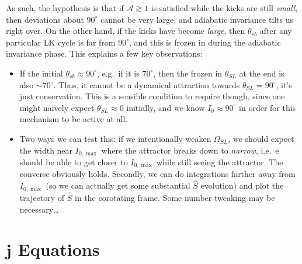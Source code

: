 \documentclass[11pt,
        usenames, %
        dvipsnames %
    ]{article}
\newcommand*{\bm}[1]{\boldsymbol{\mathbf{#1}}}
\begin{document}
As such, the hypothesis is that if $\mathcal{A} \gtrsim 1$ is satisfied while
the kicks are still \emph{small}, then deviations about $90^\circ$ cannot be
very large, and adiabatic invariance tilts us right over. On the other hand, if
the kicks have become \emph{large}, then $\theta_{sb}$ after any particular LK
cycle is far from $90^\circ$, and this is frozen in during the adiabatic
invariance phase. This explains a few key observations:
\begin{itemize}
    \item If the initial $\theta_{sb} \approx 90^\circ$, e.g.\ if it is
        $70^\circ$, then the frozen in $\theta_{SL}$ at the end is also $\sim
        70^\circ$. Thus, it cannot be a dynamical attraction towards
        $\theta_{SL} = 90^\circ$, it's just conservation. This is a sensible
        condition to require though, since one might naively expect $\theta_{SL}
        \approx 0$ initially, and we know $I_0 \approx 90^\circ$ in order for
        this mechanism to be active at all.

    \item Two ways we can test this: if we intentionally weaken $\Omega_{SL}$,
        we should expect the width near $I_{0, \max}$ where the attractor breaks
        down to \emph{narrow}, i.e.\ e should be able to get closer to $I_{0,
        \max}$ while still seeing the attractor. The converse obviously holds.
        Secondly, we can do integrations farther away from $I_{0, \max}$ (so we
        can actually get some substantial $\hat{S}$ evolution) and plot the
        trajectory of $\hat{S}$ in the corotating frame. Some number tweaking
        may be necessary\dots
\end{itemize}

\appendix

\section{$\bm{j}$ Equations}
\end{document}
